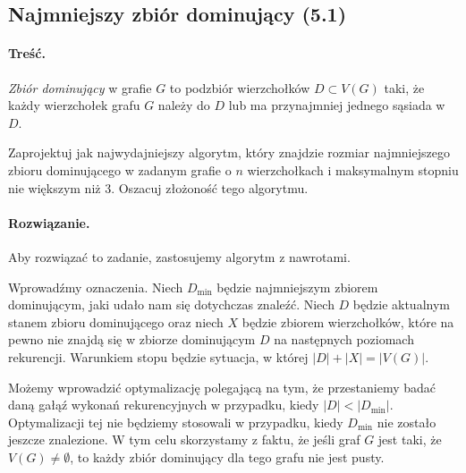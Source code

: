\subsection{Najmniejszy zbiór dominujący (5.1)}
\paragraph{Treść.}
\textit{Zbiór dominujący} w grafie $G$ to podzbiór wierzchołków 
$D \subset V(G)$ taki, że każdy wierzchołek grafu $G$
należy do $D$ lub ma przynajmniej jednego sąsiada w $D$.

Zaprojektuj jak najwydajniejszy algorytm, który znajdzie rozmiar najmniejszego zbioru dominującego w zadanym
grafie o $n$ wierzchołkach i maksymalnym stopniu nie większym niż 3. Oszacuj złożoność tego algorytmu.

\paragraph{Rozwiązanie.}
Aby rozwiązać to zadanie, zastosujemy algorytm z nawrotami.

Wprowadźmy oznaczenia.
Niech $D_{\min}$ będzie najmniejszym zbiorem dominującym, jaki udało 
nam się dotychczas znaleźć.
Niech $D$ będzie aktualnym stanem zbioru dominującego oraz
niech $X$ będzie zbiorem wierzchołków, które na pewno nie znajdą się 
w zbiorze dominującym $D$ na następnych poziomach rekurencji.
Warunkiem stopu będzie sytuacja, w której $|D| + |X| = |V(G)|$.

Możemy wprowadzić optymalizację polegającą na tym, że 
przestaniemy badać daną gałąź wykonań rekurencyjnych
w przypadku, kiedy $|D| < |D_{\min}|$. Optymalizacji tej nie będziemy
stosowali w przypadku, kiedy $D_{\min}$ nie zostało jeszcze znalezione. 
W tym celu skorzystamy z faktu, że jeśli graf $G$ jest 
taki, że $V(G) \not = \emptyset$,
to każdy zbiór dominujący dla tego grafu nie jest pusty.

